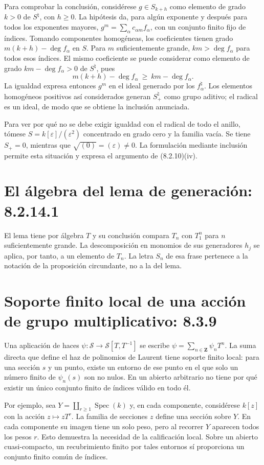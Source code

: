\documentclass[11pt,a4paper]{article}
\DeclareMathOperator{\Spec}{Spec}
\begin{document}
Para comprobar la conclusión, considérese $g\in S_{k+h}$ como
elemento de grado $k>0$ de $S^\natural$, con $h\geq0$.
La hipótesis da, para algún exponente y después para todos los
exponentes mayores,
$g^m=\sum_\alpha c_{\alpha m}f_\alpha$, con un conjunto finito
fijo de índices. Tomando componentes homogéneas, los coeficientes
tienen grado $m(k+h)-\deg f_\alpha$ en $S$.
Para $m$ suficientemente grande, $km>\deg f_\alpha$ para todos
esos índices. El mismo coeficiente se puede considerar como
elemento de grado $km-\deg f_\alpha>0$ de $S^\natural$, pues
\[
m(k+h)-\deg f_\alpha\ \geq\ km-\deg f_\alpha.
\]
La igualdad expresa entonces $g^m$ en el ideal generado por los
$f^\natural_\alpha$. Los elementos homogéneos positivos así
considerados generan $S^\natural_+$ como grupo aditivo; el radical
es un ideal, de modo que se obtiene la inclusión anunciada.

Para ver por qué no se debe exigir igualdad con el radical de todo
el anillo, tómese $S=k[\varepsilon]/(\varepsilon^2)$ concentrado
en grado cero y la familia vacía. Se tiene $S_+=0$, mientras que
$\sqrt{(0)}=(\varepsilon)\ne0$. La formulación mediante inclusión
permite esta situación y expresa el argumento de (8.2.10)(iv).

\section{El álgebra del lema de generación: 8.2.14.1}
El lema tiene por álgebra $T$ y su conclusión compara $T_n$ con
$T_1^n$ para $n$ suficientemente grande. La descomposición en
monomios de sus generadores $h_j$ se aplica, por tanto, a un
elemento de $T_n$. La letra $S_n$ de esa frase pertenece a la
notación de la proposición circundante, no a la del lema.

\section{Soporte finito local de una acción de grupo multiplicativo: 8.3.9}
Una aplicación de haces
$\psi:\mathcal S\to\mathcal S[T,T^{-1}]$ se escribe
$\psi=\sum_{n\in\mathbf Z}\psi_nT^n$.
La suma directa que define el haz de polinomios de Laurent tiene
soporte finito local: para una sección $s$ y un punto, existe un
entorno de ese punto en el que solo un número finito de
$\psi_n(s)$ son no nulos. En un abierto arbitrario no tiene por
qué existir un único conjunto finito de índices válido en todo él.

Por ejemplo, sea $Y=\coprod_{r\geq1}\Spec(k)$ y, en cada componente,
considérese $k[z]$ con la acción $z\mapsto zT^r$.
La familia de secciones $z$ define una sección sobre $Y$.
En cada componente su imagen tiene un solo peso, pero al recorrer
$Y$ aparecen todos los pesos $r$. Esto demuestra la necesidad de
la calificación local. Sobre un abierto cuasi-compacto, un
recubrimiento finito por tales entornos sí proporciona un conjunto
finito común de índices.
\end{document}
